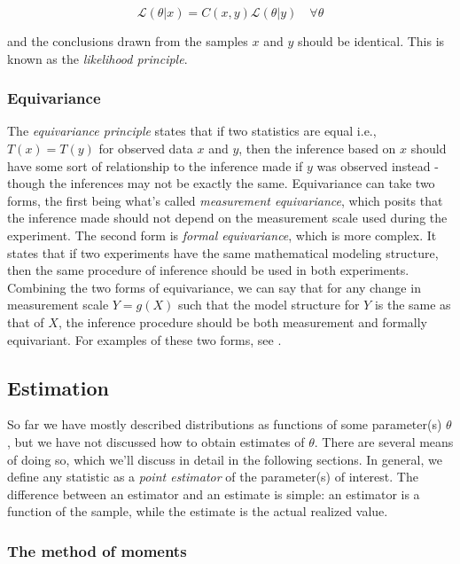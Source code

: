 \documentclass{report}
\begin{document}
\begin{equation}\label{eq:likelihood principle}
    \mathcal{L}(\theta|x) = C(x,y) \mathcal{L}(\theta|y) \quad \forall \theta 
\end{equation}

and the conclusions drawn from the samples $x$ and $y$ should be identical. This is known as the \textit{likelihood principle}. 

\subsubsection{Equivariance}

The \textit{equivariance principle} states that if two statistics are equal i.e., $T(x) = T(y)$ for observed data $x$ and $y$, then the inference based on $x$ should have some sort of relationship to the inference made if $y$ was observed instead - though the inferences may not be exactly the same. Equivariance can take two forms, the first being what's called \textit{measurement equivariance}, which posits that the inference made should not depend on the measurement scale used during the experiment. The second form is \textit{formal equivariance}, which is more complex. It states that if two experiments have the same mathematical modeling structure, then the same procedure of inference should be used in both experiments. Combining the two forms of equivariance, we can say that for any change in measurement scale $Y = g(X)$ such that the model structure for $Y$ is the same as that of $X$, the inference procedure should be both measurement and formally equivariant. For examples of these two forms, see \cite[Chapter~6.4]{casella_statistical_2002}. 

\subsection{Estimation}

So far we have mostly described distributions as functions of some parameter(s) $\theta$, but we have not discussed how to obtain estimates of $\theta$. There are several means of doing so, which we'll discuss in detail in the following sections. In general, we define any statistic as a \textit{point estimator} of the parameter(s) of interest. The difference between an estimator and an estimate is simple: an estimator is a function of the sample, while the estimate is the actual realized value. 

\subsubsection{The method of moments}
\end{document}
